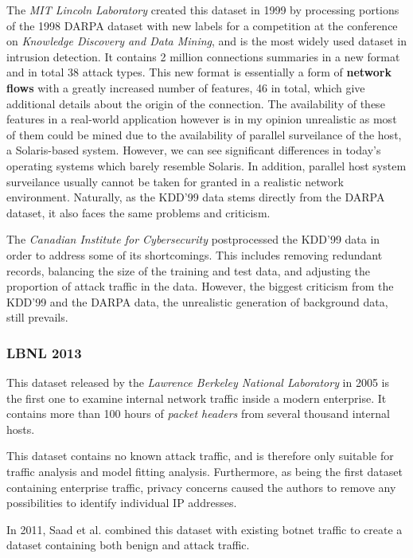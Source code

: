 \documentclass[a4paper,12pt,twoside]{report}
\begin{document}
The \textit{MIT Lincoln Laboratory} created this dataset in 1999 by processing portions of the 1998 DARPA dataset with new labels for a competition at the conference on \textit{Knowledge Discovery and Data Mining}, and is the most widely used dataset in intrusion detection. It contains 2 million connections summaries in a new format and in total 38 attack types. This new format is essentially a form of \textbf{network flows} with a greatly increased number of features, 46 in total, which give additional details about the origin of the connection. The availability of these features in a real-world application however is in my opinion unrealistic as most of them could be mined due to the availability of parallel surveilance of the host, a Solaris-based system. However, we can see significant differences in today's operating systems which barely resemble Solaris. In addition, parallel host system surveilance usually cannot be taken for granted in a realistic network environment. Naturally, as the KDD'99 data stems directly from the DARPA dataset, it also faces the same problems and criticism. 

The \textit{Canadian Institute for Cybersecurity} postprocessed the KDD'99 data in order to address some of its shortcomings. This includes removing redundant records, balancing the size of the training and test data, and adjusting the proportion of attack traffic in the data. However, the biggest criticism from the KDD'99 and the DARPA data, the unrealistic generation of background data, still prevails.

\subsubsection*{LBNL 2013 \cite{pang2005first}}

This dataset released by the \textit{Lawrence Berkeley National Laboratory} in 2005 is the first one to examine internal network traffic inside a modern enterprise. It contains more than 100 hours of \textit{packet headers} from several thousand internal hosts. 

This dataset contains no known attack traffic, and is therefore only suitable for traffic analysis and model fitting analysis. Furthermore, as being the first dataset containing enterprise traffic, privacy concerns caused the authors to remove any possibilities to identify individual IP addresses.

In 2011, Saad et al. \cite{saad2011detecting} combined this dataset with existing botnet traffic to create a dataset containing both benign and attack traffic. 
\end{document}
